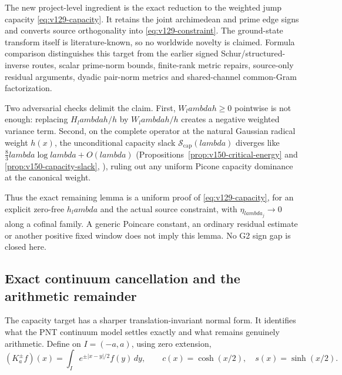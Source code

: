 \documentclass[11pt]{article}
\def\lambda{lambda}%
\theoremstyle{remark}
\begin{document}
The new project-level ingredient is the exact reduction to the
weighted jump capacity \eqref{eq:v129-capacity}. It retains the joint
archimedean and prime edge signs and converts source orthogonality into
\eqref{eq:v129-constraint}. The ground-state transform itself is
literature-known, so no worldwide novelty is claimed. Formula
comparison distinguishes this target from the earlier signed
Schur/structured-inverse routes, scalar prime-norm bounds, finite-rank
metric repairs, source-only residual arguments, dyadic pair-norm
metrics and shared-channel common-Gram factorization.

Two adversarial checks delimit the claim. First, $W_\lambda h\ge0$
pointwise is not enough: replacing $H_\lambda h/h$ by
$W_\lambda h/h$ creates a negative weighted variance term. Second, on the complete operator at the natural Gaussian radical weight $h(x)$, the unconditional capacity slack $\mathcal S_{\mathrm{cap}}(\lambda)$ diverges like $\frac{8}{3}\lambda\log\lambda+O(\lambda)$ (Propositions~\ref{prop:v150-critical-energy} and \ref{prop:v150-capacity-slack}, ), ruling out any uniform Picone capacity dominance at the canonical weight.

Thus the exact remaining lemma is a uniform proof of
\eqref{eq:v129-capacity}, for an explicit zero-free $h_\lambda$ and the
actual source constraint, with $\eta_{\lambda_j}\to0$ along a cofinal
family. A generic Poincare constant, an ordinary residual estimate or
another positive fixed window does not imply this lemma. No G2 sign
gap is closed here.

\subsection{Exact continuum cancellation and the arithmetic remainder}

The capacity target has a sharper translation-invariant normal form.
It identifies what the PNT continuum model settles exactly and what
remains genuinely arithmetic. Define on $I=(-a,a)$, using zero
extension,
\[
 (K_a^\pm f)(x)=\int_I e^{\pm|x-y|/2}f(y)\,dy,\qquad
 c(x)=\cosh(x/2),\quad s(x)=\sinh(x/2).
\]
\end{document}
